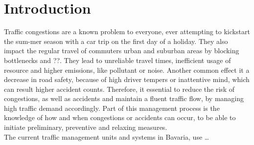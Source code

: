 \documentclass[a4paper,12pt]{report}
\begin{document}
\renewcommand\abstractname{Preliminary information and disclaimers}

\tableofcontents
\thispagestyle{empty}

\chapter{Introduction}
\setcounter{page}{1}
\par Traffic congestions are a known problem to everyone, ever attempting to kickstart the sum-mer season with a car trip on the first day of a holiday. They also impact the regular travel of commuters urban and suburban areas by blocking bottlenecks and ??. They lead to unreliable travel times, inefficient usage of resource and higher emissions, like pollutant or noise. Another common effect it a decrease in road safety, because of high driver tempers or inattentive mind, which can result higher accident counts. Therefore, it essential to reduce the risk of congestions, as well as accidents and maintain a fluent traffic flow, by managing high traffic demand accordingly. Part of this management process is the knowledge of how and when congestions or accidents can occur, to be able to initiate preliminary, preventive and relaxing measures. \\

The current traffic management units and systems in Bavaria, use … 
\\
\end{document}
